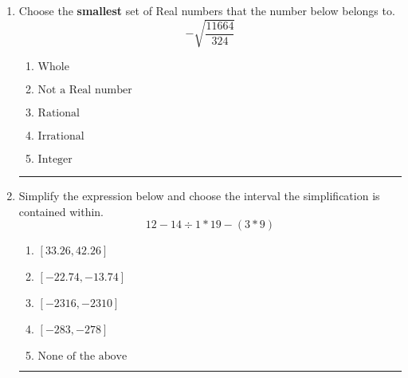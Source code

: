 \documentclass[14pt]{extbook}
\newcommand{\litem}[1]{\item#1\hspace*{-1cm}\rule{\textwidth}{0.4pt}}
\begin{document}
\begin{enumerate}
{\begin{enumerate}[label=\Alph*.]
\end{enumerate} }
\litem{
Choose the \textbf{smallest} set of Real numbers that the number below belongs to.\[ -\sqrt{\frac{11664}{324}} \]\begin{enumerate}[label=\Alph*.]
\item \( \text{Whole} \)
\item \( \text{Not a Real number} \)
\item \( \text{Rational} \)
\item \( \text{Irrational} \)
\item \( \text{Integer} \)

\end{enumerate} }
\litem{
Simplify the expression below and choose the interval the simplification is contained within.\[ 12 - 14 \div 1 * 19 - (3 * 9) \]\begin{enumerate}[label=\Alph*.]
\item \( [33.26, 42.26] \)
\item \( [-22.74, -13.74] \)
\item \( [-2316, -2310] \)
\item \( [-283, -278] \)
\item \( \text{None of the above} \)

\end{enumerate} }
\end{enumerate}
\end{document}
